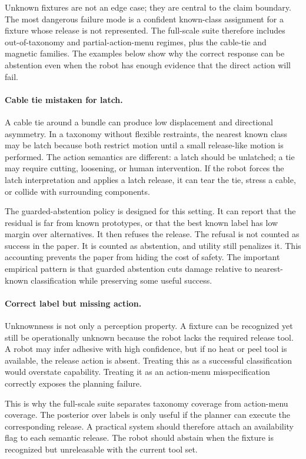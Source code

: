 \documentclass{article}
\begin{document}
Unknown fixtures are not an edge case; they are central to the claim boundary.
The most dangerous failure mode is a confident known-class assignment for a
fixture whose release is not represented. The full-scale suite therefore
includes out-of-taxonomy and partial-action-menu regimes, plus the cable-tie
and magnetic families. The examples below show why the correct response can be
abstention even when the robot has enough evidence that the direct action will
fail.

\paragraph{Cable tie mistaken for latch.}
A cable tie around a bundle can produce low displacement and directional
asymmetry. In a taxonomy without flexible restraints, the nearest known class
may be latch because both restrict motion until a small release-like motion is
performed. The action semantics are different: a latch should be unlatched; a
tie may require cutting, loosening, or human intervention. If the robot forces
the latch interpretation and applies a latch release, it can tear the tie,
stress a cable, or collide with surrounding components.

The guarded-abstention policy is designed for this setting. It can report that
the residual is far from known prototypes, or that the best known label has low
margin over alternatives. It then refuses the release. The refusal is not
counted as success in the paper. It is counted as abstention, and utility still
penalizes it. This accounting prevents the paper from hiding the cost of
safety. The important empirical pattern is that guarded abstention cuts damage
relative to nearest-known classification while preserving some useful success.

\paragraph{Correct label but missing action.}
Unknownness is not only a perception property. A fixture can be recognized yet
still be operationally unknown because the robot lacks the required release
tool. A robot may infer adhesive with high confidence, but if no heat or peel
tool is available, the release action is absent. Treating this as a successful
classification would overstate capability. Treating it as an action-menu
misspecification correctly exposes the planning failure.

This is why the full-scale suite separates taxonomy coverage from action-menu
coverage. The posterior over labels is only useful if the planner can execute
the corresponding release. A practical system should therefore attach an
availability flag to each semantic release. The robot should abstain when the
fixture is recognized but unreleasable with the current tool set.
\end{document}
